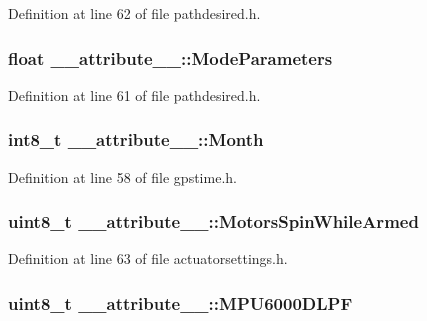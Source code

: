 \-Definition at line 62 of file pathdesired.\-h.

\hypertarget{struct____attribute_____a3af6821fa653a4a0daf65622b96f7109}{
\subsubsection[{\-Mode\-Parameters}]{\setlength{\rightskip}{0pt plus 5cm}float {\bf \-\_\-\-\_\-attribute\-\_\-\-\_\-\-::\-Mode\-Parameters}}}\label{struct____attribute_____a3af6821fa653a4a0daf65622b96f7109}


\-Definition at line 61 of file pathdesired.\-h.

\hypertarget{struct____attribute_____a3cadf53d572a7df7445c6077008521fc}{
\subsubsection[{\-Month}]{\setlength{\rightskip}{0pt plus 5cm}int8\-\_\-t {\bf \-\_\-\-\_\-attribute\-\_\-\-\_\-\-::\-Month}}}\label{struct____attribute_____a3cadf53d572a7df7445c6077008521fc}


\-Definition at line 58 of file gpstime.\-h.

\hypertarget{struct____attribute_____abc11f4bd9c9e00376dba7207b3355ce0}{
\subsubsection[{\-Motors\-Spin\-While\-Armed}]{\setlength{\rightskip}{0pt plus 5cm}uint8\-\_\-t {\bf \-\_\-\-\_\-attribute\-\_\-\-\_\-\-::\-Motors\-Spin\-While\-Armed}}}\label{struct____attribute_____abc11f4bd9c9e00376dba7207b3355ce0}


\-Definition at line 63 of file actuatorsettings.\-h.

\hypertarget{struct____attribute_____ae9e1250d131cb022b03ea53e8bd92915}{
\subsubsection[{\-M\-P\-U6000\-D\-L\-P\-F}]{\setlength{\rightskip}{0pt plus 5cm}uint8\-\_\-t {\bf \-\_\-\-\_\-attribute\-\_\-\-\_\-\-::\-M\-P\-U6000\-D\-L\-P\-F}}}\label{struct____attribute_____ae9e1250d131cb022b03ea53e8bd92915}


